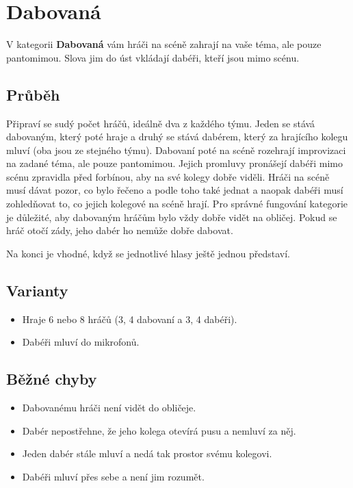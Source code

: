  
 
 
 
\needspace{5cm} \section{Dabovaná} \label{dabovaná}  
 
 
V kategorii \textbf{Dabovaná}{} vám hráči na scéně zahrají na vaše téma, ale pouze pantomimou. Slova jim do úst vkládají dabéři, kteří jsou mimo scénu. 
 
 
\subsection{Průběh} Připraví se sudý počet hráčů, ideálně dva z každého týmu. Jeden se stává dabovaným, který poté hraje a druhý se stává dabérem, který za hrajícího kolegu mluví (oba jsou ze stejného týmu).  
Dabovaní poté na scéně rozehrají improvizaci na zadané téma, ale pouze pantomimou. Jejich promluvy pronášejí dabéři mimo scénu zpravidla před forbínou, aby na své kolegy dobře viděli. Hráči na scéně musí dávat pozor, co bylo řečeno a podle toho také jednat a naopak dabéři musí zohledňovat to, co jejich kolegové na scéně hrají. Pro správné fungování kategorie je důležité, aby dabovaným hráčům bylo vždy dobře vidět na obličej. Pokud se hráč otočí zády, jeho dabér ho nemůže dobře dabovat. 
 
Na konci je vhodné, když se jednotlivé hlasy ještě jednou představí. 
 
\subsection{ Varianty } \begin{itemize}
\item Hraje 6 nebo 8 hráčů (3, 4 dabovaní a 3, 4 dabéři).
\item Dabéři mluví do mikrofonů.
\end{itemize}
 
\subsection{ Běžné chyby } \begin{itemize}
\item Dabovanému hráči není vidět do obličeje.
\item Dabér nepostřehne, že jeho kolega otevírá pusu a nemluví za něj.
\item Jeden dabér stále mluví a nedá tak prostor svému kolegovi.
\item Dabéři mluví přes sebe a není jim rozumět.
\end{itemize}
 
